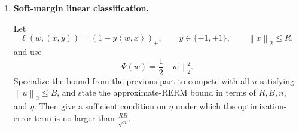 \documentclass[11pt]{article}
\newcommand{\E}{\mathbb{E}}
\newcommand{\norm}[1]{\left\lVert #1 \right\rVert}
\newcommand{\ip}[2]{\left\langle #1,#2 \right\rangle}
\begin{document}
\begin{enumerate}
\begin{solutionbox}
this becomes

\[
\boxed{
\eta
\le
\frac{GB}
     {\sqrt2\,\sqrt{\alpha}\,n^{3/2}}
}.
\]

Thus this is a sufficient condition on the optimization accuracy.

\medskip

\textbf{Step 8: State the final learning guarantee.}

Under the condition

\[
\eta
\le
\frac{GB}
     {\sqrt2\,\sqrt{\alpha}\,n^{3/2}},
\]

the optimization-error term satisfies

\[
G\sqrt{
\frac{2\eta}
     {\lambda\alpha}
}
\le
\frac{GB}
     {\sqrt{\alpha n}}.
\]

Substituting this into the bound from Step 5 yields

\[
\E_S L_{\mathcal D}(\widetilde w_S)
\le
L_{\mathcal D}(u)
+
\frac{2\sqrt2\,GB}
     {\sqrt{\alpha n}}
+
\frac{GB}
     {\sqrt{\alpha n}}.
\]

Combining the coefficients,

\[
\boxed{
\E_S L_{\mathcal D}(\widetilde w_S)
\le
L_{\mathcal D}(u)
+
(2\sqrt2+1)
\frac{GB}
     {\sqrt{\alpha n}}
}.
\]

\medskip

\textbf{Interpretation.}

The exact RERM algorithm achieves a learning rate on the order of

\[
\frac{GB}{\sqrt{\alpha n}}.
\]

This result shows that approximate optimization achieves the same statistical rate provided that the optimization error decreases sufficiently quickly, namely

\[
\eta
=
O\!\left(
\frac{1}{n^{3/2}}
\right).
\]

Under this condition, the optimization error remains smaller than the inherent statistical uncertainty of the learning problem and therefore does not change the overall learning rate.

\end{solutionbox}

\item \textbf{Soft-margin linear classification.}

Let
\[
\ell(w,(x,y))=(1-y\ip{w}{x})_+,
\qquad
 y\in\{-1,+1\},
\qquad
\norm{x}_2\le R,
\]
and use
\[
\Psi(w)=\frac12\norm{w}_2^2.
\]
Specialize the bound from the previous part to compete with all $u$ satisfying $\norm{u}_2\le B$, and state the approximate-RERM bound in terms of $R,B,n$, and $\eta$. Then give a sufficient condition on $\eta$ under which the optimization-error term is no larger than $\frac{RB}{\sqrt{n}}$.


\end{enumerate}
\end{document}
